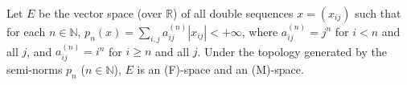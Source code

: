 Let $E$ be the vector space (over $\mathbb{R}$) of all double sequences $x = (x_{ij})$ such that for each $n \in \mathbb{N}$, $p_n(x) = \sum_{i,j} a_{ij}^{(n)} |x_{ij}| < +\infty$, where $a_{ij}^{(n)} = j^n$ for $i < n$ and all $j$, and $a_{ij}^{(n)} = i^n$ for $i \geq n$ and all $j$. Under the topology generated by the semi-norms $p_n$ ($n \in \mathbb{N}$), $E$ is an (F)-space and an (M)-space.

